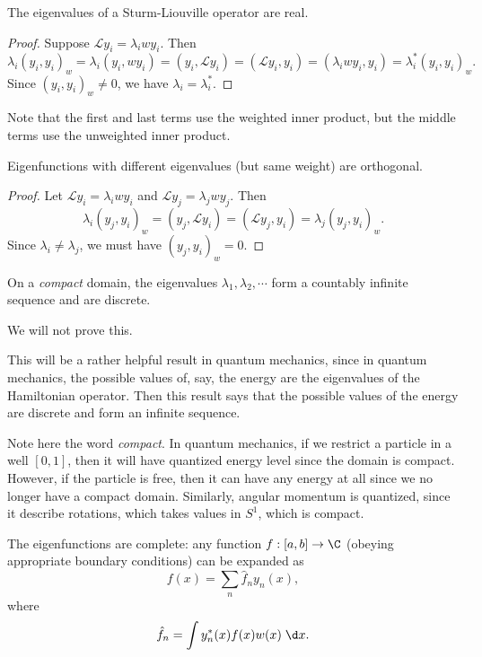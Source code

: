 \documentclass[a4paper]{article}
\begin{document}
\begin{prop}
  The eigenvalues of a Sturm-Liouville operator are real.
\end{prop}

\begin{proof}
  Suppose $\mathcal{L} y_i = \lambda_i w y_i$. Then
  \[
    \lambda_i (y_i, y_i)_w = \lambda_i (y_i, w y_i) = (y_i, \mathcal{L} y_i) = (\mathcal{L} y_i, y_i) = (\lambda_i w y_i, y_i) = \lambda_i^* (y_i, y_i)_w.
  \]
  Since $(y_i, y_i)_w \not= 0$, we have $\lambda_i = \lambda_i^*$.
\end{proof}
Note that the first and last terms use the weighted inner product, but the middle terms use the unweighted inner product.

\begin{prop}
  Eigenfunctions with different eigenvalues (but same weight) are orthogonal.
\end{prop}

\begin{proof}
  Let $\mathcal{L} y_i = \lambda_i w y_i$ and $\mathcal{L} y_j = \lambda_j w y_j$. Then
  \[
    \lambda_i (y_j, y_i)_w = (y_j, \mathcal{L} y_i) = (\mathcal{L} y_j, y_i) = \lambda_j (y_j, y_i)_w.
  \]
  Since $\lambda_i \not= \lambda_j$, we must have $(y_j, y_i)_w = 0$.
\end{proof}

\begin{prop}
  On a \emph{compact} domain, the eigenvalues $\lambda_1, \lambda_2, \cdots$ form a countably infinite sequence and are discrete.
\end{prop}
We will not prove this.

This will be a rather helpful result in quantum mechanics, since in quantum mechanics, the possible values of, say, the energy are the eigenvalues of the Hamiltonian operator. Then this result says that the possible values of the energy are discrete and form an infinite sequence.

Note here the word \emph{compact}. In quantum mechanics, if we restrict a particle in a well $[0, 1]$, then it will have quantized energy level since the domain is compact. However, if the particle is free, then it can have any energy at all since we no longer have a compact domain. Similarly, angular momentum is quantized, since it describe rotations, which takes values in $S^1$, which is compact.

\begin{prop}
  The eigenfunctions are complete: any function $f: [a, b] \to \C$ (obeying appropriate boundary conditions) can be expanded as
  \[
    f(x) = \sum_n \hat{f}_n y_n(x),
  \]
  where
  \[
    \hat{f}_n = \int y^*_n(x) f(x) w(x)\;\d x.
  \]
\end{prop}
\end{document}
